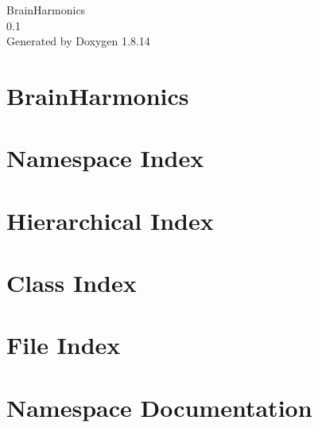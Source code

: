\documentclass[twoside]{book}
\newcommand{\+}{\discretionary{\mbox{\scriptsize$\hookleftarrow$}}{}{}}
\newcommand{\clearemptydoublepage}{%
  \newpage{\pagestyle{empty}\cleardoublepage}%
}
\begin{document}
\hypersetup{pageanchor=false,
             bookmarksnumbered=true,
             pdfencoding=unicode
            }
\begin{titlepage}
\vspace*{7cm}
\begin{center}%
{\Large Brain\+Harmonics \\[1ex]\large 0.\+1 }\\
\vspace*{1cm}
{\large Generated by Doxygen 1.8.14}\\
\end{center}
\end{titlepage}
\clearemptydoublepage
{}
\tableofcontents
\clearemptydoublepage
{}
\hypersetup{pageanchor=true}

\chapter{Brain\+Harmonics}
\label{md__r_e_a_d_m_e}

\chapter{Namespace Index}

\chapter{Hierarchical Index}

\chapter{Class Index}

\chapter{File Index}

\chapter{Namespace Documentation}




\end{document}
